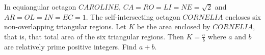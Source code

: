 In equiangular octagon $CAROLINE$, $CA = RO = LI = NE = \sqrt{2}$ and $AR = OL = IN = EC = 1$. The self-intersecting octagon $CORNELIA$ encloses six non-overlapping triangular regions. Let $K$ be the area enclosed by $CORNELIA$, that is, that total area of the six triangular regions. Then $K=\tfrac{a}{b}$ where $a$ and $b$ are relatively prime positive integers. Find $a + b$.